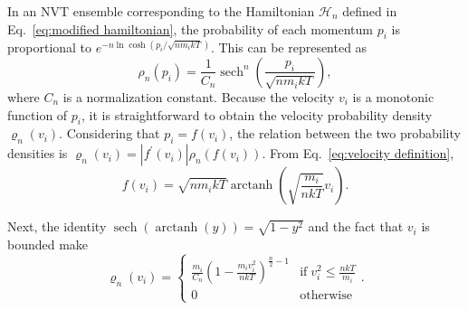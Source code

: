 \documentclass[
aip,
jcp,
reprint,
]{revtex4-1}
\DeclareMathOperator\arctanh{arctanh}
\DeclareMathOperator\sech{sech}
\newcommand{\nn}{n}
\begin{document}
In an NVT ensemble corresponding to the Hamiltonian ${\mathcal H}_n$ defined in Eq.~\eqref{eq:modified hamiltonian}, the probability of each momentum $p_i$ is proportional to $e^{-\nn\ln\cosh(p_i/\sqrt{\nn m_i kT})}$.
This can be represented as
\begin{equation*}
\rho_n(p_i) = \frac{1}{C_n} \sech^\nn\left(\frac{p_i}{\sqrt{\nn m_i k T}}\right),
\end{equation*}
where $C_n$ is a normalization constant.
Because the velocity $v_i$ is a monotonic function of $p_i$, it is straightforward to obtain the velocity probability density $\varrho_n(v_i)$.
Considering that $p_i = f(v_i)$, the relation between the two probability densities is $\varrho_n(v_i) = |f^\prime(v_i)| \rho_n\left(f(v_i)\right)$.
From Eq.~\eqref{eq:velocity definition},
\begin{equation}
\label{eq:momentum as a function of velocity}
f(v_i) = \sqrt{\nn m_i k T}\arctanh\left(\sqrt{\frac{m_i}{\nn k T}} v_i\right).
\end{equation}


Next, the identity $\sech(\arctanh(y)) = \sqrt{1-y^2}$ and the fact that $v_i$ is bounded make
\begin{equation*}
\varrho_n(v_i) = \begin{cases}
\frac{m_i}{C_n} \left(1-\frac{m_i v_i^2}{\nn k T}\right)^{\frac{\nn}{2} - 1} & \mathrm{if} \; v_i^2 \leq \frac{\nn k T}{m_i} \\
0 & \mathrm{otherwise}
\end{cases}.
\end{equation*}
\end{document}
